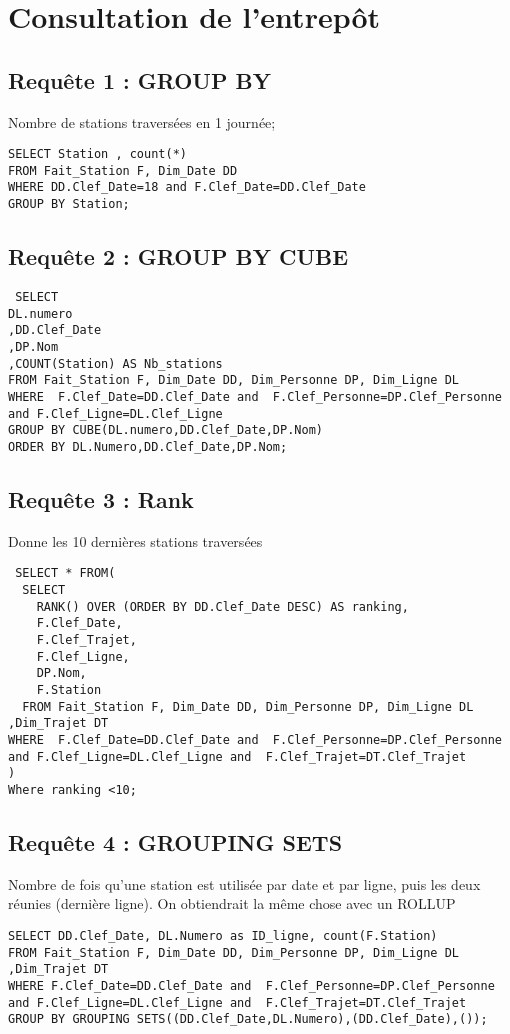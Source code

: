 \chapter{Consultation de l'entrepôt}
\section{Requête 1 : GROUP BY }
Nombre de stations traversées en 1 journée;
\begin{verbatim}
SELECT Station , count(*)
FROM Fait_Station F, Dim_Date DD
WHERE DD.Clef_Date=18 and F.Clef_Date=DD.Clef_Date
GROUP BY Station;
\end{verbatim}

\section{Requête 2 : GROUP BY CUBE}
\begin{verbatim}
 SELECT
DL.numero
,DD.Clef_Date
,DP.Nom
,COUNT(Station) AS Nb_stations
FROM Fait_Station F, Dim_Date DD, Dim_Personne DP, Dim_Ligne DL 
WHERE  F.Clef_Date=DD.Clef_Date and  F.Clef_Personne=DP.Clef_Personne and F.Clef_Ligne=DL.Clef_Ligne
GROUP BY CUBE(DL.numero,DD.Clef_Date,DP.Nom)
ORDER BY DL.Numero,DD.Clef_Date,DP.Nom;
\end{verbatim}

\clearpage
\section{Requête 3 : Rank}
Donne les 10 dernières stations traversées
\begin{verbatim}
 SELECT * FROM(
  SELECT
    RANK() OVER (ORDER BY DD.Clef_Date DESC) AS ranking,
    F.Clef_Date,
    F.Clef_Trajet,
    F.Clef_Ligne,
    DP.Nom,
    F.Station
  FROM Fait_Station F, Dim_Date DD, Dim_Personne DP, Dim_Ligne DL ,Dim_Trajet DT
WHERE  F.Clef_Date=DD.Clef_Date and  F.Clef_Personne=DP.Clef_Personne and F.Clef_Ligne=DL.Clef_Ligne and  F.Clef_Trajet=DT.Clef_Trajet 
)
Where ranking <10;
\end{verbatim}

\section{Requête 4 : GROUPING SETS }
Nombre de fois qu'une station est utilisée par date et par ligne, puis les deux réunies (dernière ligne). On obtiendrait la même chose avec un ROLLUP
\begin{verbatim}
SELECT DD.Clef_Date, DL.Numero as ID_ligne, count(F.Station)
FROM Fait_Station F, Dim_Date DD, Dim_Personne DP, Dim_Ligne DL ,Dim_Trajet DT
WHERE F.Clef_Date=DD.Clef_Date and  F.Clef_Personne=DP.Clef_Personne and F.Clef_Ligne=DL.Clef_Ligne and  F.Clef_Trajet=DT.Clef_Trajet
GROUP BY GROUPING SETS((DD.Clef_Date,DL.Numero),(DD.Clef_Date),());
\end{verbatim}

